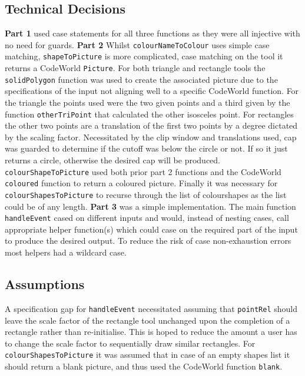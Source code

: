 \documentclass[11pt]{article}
\begin{document}
\subsection{Technical Decisions}
\textbf{Part 1} used case statements for all three functions as they were all injective with no need for guards.
 \textbf{Part 2} Whilst \verb|colourNameToColour| uses simple case matching, \verb|shapeToPicture| is more complicated, case matching on the tool it returns a CodeWorld \verb|Picture|. For both triangle and rectangle tools the \verb|solidPolygon| function was used to create the associated picture due to the specifications of the input not aligning well to a specific CodeWorld function. For the triangle the points used were the two given points and a third given by the function \verb|otherTriPoint| that calculated the other isosceles point. For rectangles the other two points are a translation of the first two points by a degree dictated by the scaling factor. Necessitated by the clip window and translations used, cap was guarded to determine if the cutoff was below the circle or not. If so it just returns a circle, otherwise the desired cap will be produced. \verb|colourShapeToPicture| used both prior part 2 functions and the CodeWorld  \verb|coloured| function to return a coloured picture. Finally it was necessary for  \verb|colourShapesToPicture| to recurse through the list of colourshapes as the list could be of any length.
 \textbf{Part 3} was a simple implementation. The main function \verb|handleEvent| cased on different inputs and would, instead of nesting cases, call appropriate helper function(s) which could case on the required part of the input to produce the desired output.  To reduce the risk of case non-exhaustion errors most helpers had a wildcard case.

 \subsection{Assumptions}%
A specification gap for \verb|handleEvent| necessitated assuming that \verb|pointRel| should leave the scale factor of the rectangle tool unchanged upon the completion of a rectangle rather than re-initialise. This is hoped to reduce the amount a user has to change the scale factor to sequentially draw similar rectangles. For \verb|colourShapesToPicture| it was assumed that in case of an empty shapes list it should return a blank picture, and thus used the CodeWorld function \verb|blank|.
\end{document}
